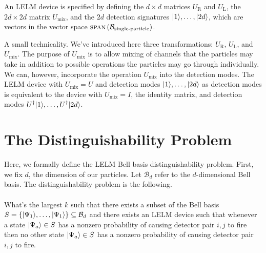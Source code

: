 An LELM device is specified by defining the $d\times d$ matrices $U_{\text{R}}$ and $U_{\text{L}}$, the $2d \times 2d$ matrix $U_{\text{mix}}$, and the $2d$ detection signatures $| 1 \rangle, \ldots, | 2d \rangle$, which are vectors in the vector space $\textsc{span}\left(\mathcal{B}_{\text{single-particle}}\right)$.

A small technicality. We've introduced here three transformations: $U_{\text{R}}$, $U_{\text{L}}$, and $U_\text{mix}$. The purpose of $U_\text{mix}$ is to allow mixing of channels that the particles may take in addition to possible operations the particles may go through individually. We can, however, incorporate the operation $U_\text{mix}$ into the detection modes. The LELM device with $U_\text{mix} = U$ and detection modes $| 1 \rangle, \ldots, | 2d \rangle$ as detection modes is equivalent to the device with $U_\text{mix} = I$, the identity matrix, and detection modes $U^\dagger | 1 \rangle, \ldots, U^\dagger | 2d \rangle$.

\section{The Distinguishability Problem}

Here, we formally define the LELM Bell basis distinguishability problem. First, we fix $d$, the dimension of our particles. Let $\mathcal{B}_d$ refer to the $d$-dimensional Bell basis. The distinguishability problem is the following.
\\ \\
What's the largest $k$ such that there exists a subset of the Bell basis $S = \{| \Psi_1 \rangle, \ldots, | \Psi_1 \rangle\} \subseteq \mathcal{B}_d$ and there exists an LELM device such that whenever a state $| \Psi_a \rangle \in S$ has a nonzero probability of causing detector pair $i, j$ to fire then no other state $| \Psi_a \rangle \in S$ has a nonzero probability of causing detector pair $i, j$ to fire. 